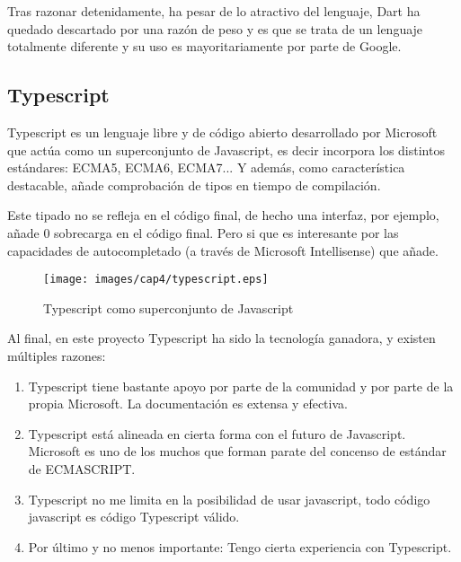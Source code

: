 \bigskip
Tras razonar detenidamente, ha pesar de lo atractivo del lenguaje, Dart ha quedado descartado por 
una razón de peso y es que se trata de un lenguaje totalmente diferente y su uso es mayoritariamente
por parte de Google.

\subsection{Typescript}

Typescript es un lenguaje libre y de código abierto desarrollado por Microsoft que actúa como un superconjunto
de Javascript, es decir incorpora los distintos estándares: ECMA5, ECMA6, ECMA7... Y además, como característica
destacable, añade comprobación de tipos en tiempo de compilación. \cite{Typescript}

\bigskip
Este tipado no se refleja en el código final, de hecho una interfaz, por ejemplo,
añade 0 sobrecarga en el código final. Pero si que es interesante por las capacidades de
autocompletado (a través de Microsoft Intellisense)  que añade.

\begin{figure}[!th]
\begin{center}
\texttt{[image: images/cap4/typescript.eps]}
\caption{Typescript como superconjunto de Javascript}
\label{fig:Typescript como superconjunto de Javascript}
\end{center}
\end{figure}

\bigskip
Al final, en este proyecto Typescript ha sido la tecnología ganadora, y existen múltiples
razones:

\begin{enumerate}

\item Typescript tiene bastante apoyo por parte de la comunidad y por parte de la propia Microsoft.
La documentación es extensa y efectiva.

\item Typescript está alineada en cierta forma con el futuro de Javascript. Microsoft es uno de los 
muchos que forman parate del concenso de estándar de ECMASCRIPT.

\item Typescript no me limita en la posibilidad de usar javascript, todo código javascript es código
Typescript válido.

\item Por último y no menos importante: Tengo cierta experiencia con Typescript.
\end{enumerate}

